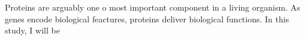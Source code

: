 Proteins are arguably one o most important component in a living organism. As genes encode biological feactures, proteins deliver biological functions.   In this study, I will be 